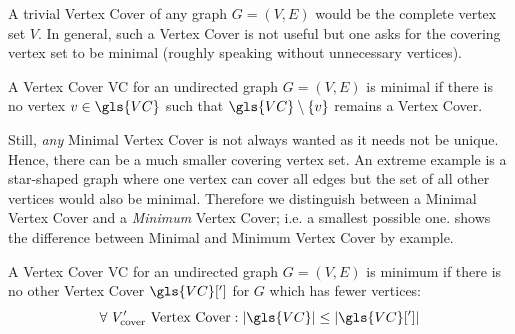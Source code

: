 A trivial Vertex Cover of any graph \(G=(V,E)\) would be the complete
vertex set \(V\). In general, such a Vertex Cover is not useful but
one asks for the covering vertex set to be minimal (roughly speaking
without unnecessary vertices).

\begin{definition}
  A Vertex Cover \gls{VC} for an undirected graph
  \(G=(V,E)\) is minimal if there is no vertex
  \(v \in \gls{VC}\) such that
  \(\gls{VC} \setminus \{v\}\) remains a Vertex Cover.
\end{definition}

Still, \emph{any} Minimal Vertex Cover is not always wanted as it
needs not be unique. Hence, there can be a much smaller covering
vertex set. An extreme example is a star-shaped graph where one vertex
can cover all edges but the set of all other vertices would also be
minimal. Therefore we distinguish between a Minimal Vertex Cover and
a \emph{Minimum} Vertex Cover; i.e. a smallest possible one. 
 shows the difference between Minimal
and Minimum Vertex Cover by example.

\begin{definition}
  A Vertex Cover \gls{VC} for an undirected graph
  \(G=(V,E)\) is minimum if there is no other Vertex Cover
  \(\gls{VC}[']\) for \(G\) which has fewer vertices:
  \[
    \forall~V_{\text{cover}}'\text{ Vertex Cover} :
    |\gls{VC}| \leq |\gls{VC}[']|
  \]
\end{definition}

